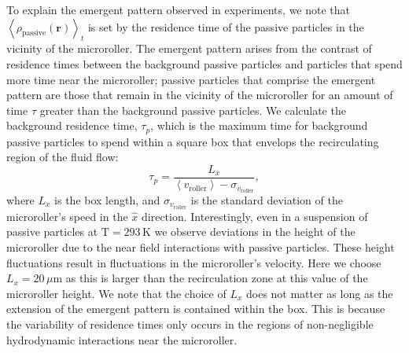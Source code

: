 \documentclass[12pt]{article}
\begin{document}
To explain the emergent pattern observed in experiments, we note that $\left< \rho_{\mathrm{passive}}\left( \mathbf{r} \right) \right>_t$ is set by the residence time of the passive particles in the vicinity of the microroller. The emergent pattern arises from the contrast of residence times between the background passive particles and particles that spend more time near the microroller; passive particles that comprise the emergent pattern are those that remain in the vicinity of the microroller for an amount of time $\tau$ greater than the background passive particles. We calculate the background residence time, $\tau_{p} $, which is the maximum time for background passive particles to spend within a square box that envelops the recirculating region of the fluid flow: 
$$\tau_{p} = \frac{L_x}{\left< v_\mathrm{roller} \right> - \sigma_{v_\mathrm{roller}}},$$ 
where $L_x$ is the box length, and $\sigma_{v_\mathrm{roller}}$ is the standard deviation of the microroller's speed in the $\hat{x}$ direction. Interestingly, even in a suspension of passive particles at $\mathrm{T} = 293 \, \mathrm{K}$ we observe deviations in the height of the microroller due to the near field interactions with passive particles. These height fluctuations result in fluctuations in the microroller's velocity. 
Here we choose $L_x = 20 \, \mu \mathrm{m}$ as this is larger than the recirculation zone at this value of the microroller height. We note that the choice of $L_x$ does not matter as long as the extension of the emergent pattern is contained within the box. This is because the variability of residence times only occurs in the regions of non-negligible hydrodynamic interactions near the microroller. 
\end{document}
